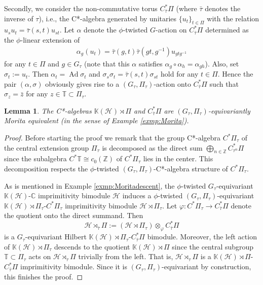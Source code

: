 \documentclass[11pt]{amsart}
\theoremstyle{definition}
\theoremstyle{plain}
\newtheorem{lem}[equation]{Lemma}
\theoremstyle{remark}
\newcommand{\bC}{\mathbb{C}}
\newcommand{\bK}{\mathbb{K}}
\newcommand{\bT}{\mathbb{T}}
\newcommand{\bZ}{\mathbb{Z}}
\newcommand{\sH}{\mathscr{H}}
\DeclareMathOperator{\Ad}{Ad}
\begin{document}
Secondly, we consider the non-commutative torus $C^*_{\bar{\tau}} \Pi$ (where $\bar{\tau}$ denotes the inverse of $\tau$), i.e., the C*-algebra generated by unitaries $\{ u_t \}_{t \in \Pi}$ with the relation $u_su_t = \bar{\tau}(s,t)u_{st}$. 
Let $\alpha$ denote the $\phi$-twisted $G$-action on $C^*_{\bar{\tau}} \Pi$ determined as the $\phi$-linear extension of 
\begin{align} 
\alpha_g(u_t) = \bar{\tau}(g,t)\bar{\tau}(gt,g^{-1})u_{gtg^{-1}} \label{eq:irr}
\end{align}
for any $t\in \Pi $ and $g \in G_\tau $ (note that this $\alpha$ satisfies $\alpha_g \circ \alpha_h=\alpha_{gh}$). 
Also, set $ \sigma _t:= u_t$. Then $\alpha_t = \Ad \sigma_t$  and $\sigma_s\sigma_t = \bar{\tau}(s,t)\sigma_{st}$ hold for any $t \in \Pi$. 
Hence the pair $(\alpha,\sigma)$ obviously gives rise to a $(G_\tau, \Pi_\tau )$-action onto $C^*_{\bar{\tau}} \Pi$ such that $\sigma_z =\bar{z}$ for any $z \in \bT \subset \Pi_\tau$. 
\begin{lem}
The C*-algebras $\bK(\sH) \rtimes \Pi$ and $C^*_{\bar{\tau}} \Pi$ are $(G_\tau, \Pi_\tau)$-equivariantly Morita equivalent (in the sense of Example \ref{exmp:Morita}). 
\end{lem}
\begin{proof}
Before starting the proof we remark that the group C*-algebra $C^*\Pi_\tau$ of the central extension group $\Pi_\tau$ is decomposed as the direct sum $\bigoplus_{n \in \bZ} C^*_{\tau^n}\Pi$ since the subalgebra $C^*\bT \cong c_0(\bZ)$ of $C^*\Pi_\tau $ lies in the center.
This decomposition respects the $\phi$-twisted $(G_\tau,\Pi_\tau)$-C*-algebra structure of $C^*\Pi_\tau$. 

As is mentioned in Example \ref{exmp:Moritadescent}, the $\phi$-twisted $G_\tau$-equivariant $\bK(\sH)$-$\bC$ imprimitivity bimodule $\sH$ induces a $\phi$-twisted $(G_\tau, \Pi_\tau)$-equivariant $\bK(\sH) \rtimes \Pi_\tau$-$C^*\Pi_\tau$ imprimitivity bimodule $\sH \rtimes \Pi_\tau$. 
Let $\varphi \colon C^*\Pi_\tau \to C^*_{\bar{\tau}} \Pi$ denote the quotient onto the direct summand. 
Then 
\[\sH \rtimes_{\bar{\tau}} \Pi := (\sH \rtimes \Pi_\tau )\otimes_\varphi C^*_{\bar{\tau}}\Pi \]
is a $G_\tau$-equivariant Hilbert $\bK(\sH) \rtimes \Pi_\tau$-$C^*_{\bar{\tau}}\Pi$ bimodule. Moreover, the left action of $\bK(\sH) \rtimes \Pi_\tau$ descends to the quotient $\bK(\sH) \rtimes \Pi$ since the central subgroup $\bT \subset \Pi_\tau$ acts on $\sH \rtimes _\tau \Pi$ trivially from the left. That is, $\sH \rtimes_\tau \Pi$ is a $\bK(\sH) \rtimes \Pi$-$C^*_{\bar{\tau}}\Pi$ imprimitivity bimodule. Since it is $(G_\tau, \Pi_\tau)$-equivariant by construction, this finishes the proof. 
\end{proof}
\end{document}
